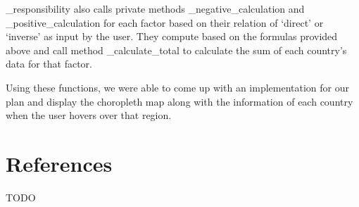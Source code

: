 \documentclass[fontsize=11pt]{article}
\begin{document}
_responsibility also calls private methods _negative_calculation and _positive_calculation for each factor based on
their relation of ‘direct’ or ‘inverse’ as input by the user. They compute based on the formulas provided above
and call method _calculate_total to calculate the sum of each country’s data for that factor.\newline

Using these functions, we were able to come up with an implementation for our plan and display the
choropleth map along with the information of each country when the user hovers over that region.\newline



\section*{References}

TODO
\end{document}
